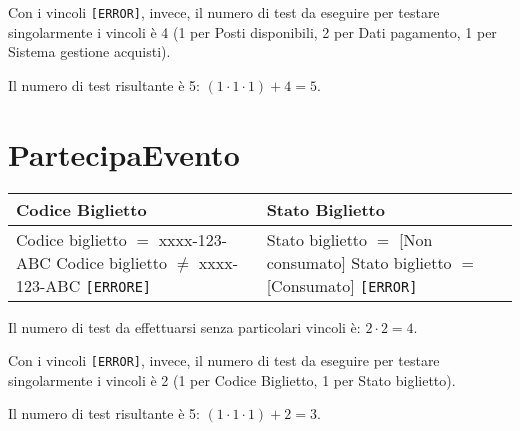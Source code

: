 \noindent Con i vincoli \texttt{[ERROR]}, invece, il numero di test da eseguire per testare singolarmente i vincoli è 4 (1 per Posti disponibili, 2 per Dati pagamento, 1 per Sistema gestione acquisti).

\noindent Il numero di test risultante è 5: $(1 \cdot 1 \cdot 1) + 4 = 5$.
\section{PartecipaEvento}
\begin{table}[H]
	\centering
	\footnotesize
	\renewcommand{\arraystretch}{1.3}
	\begin{tabular}{|p{4cm}|p{4cm}|}
		\hline
		\textbf{Codice Biglietto} & \textbf{Stato Biglietto} \\
		\hline
		Codice biglietto $=$ xxxx-123-ABC \newline
		Codice biglietto $\neq$ xxxx-123-ABC \texttt{[ERRORE]} &

		Stato biglietto $=$ [Non consumato] \newline
		Stato biglietto $=$ [Consumato] \texttt{[ERROR]} \\
		\hline
	\end{tabular}
\end{table}
\noindent Il numero di test da effettuarsi senza particolari vincoli è:
$2 \cdot 2 = 4$.

\noindent Con i vincoli \texttt{[ERROR]}, invece, il numero di test da eseguire per testare singolarmente i vincoli è 2 (1 per Codice Biglietto, 1 per Stato biglietto).

\noindent Il numero di test risultante è 5: $(1 \cdot 1 \cdot 1) + 2 = 3$.
